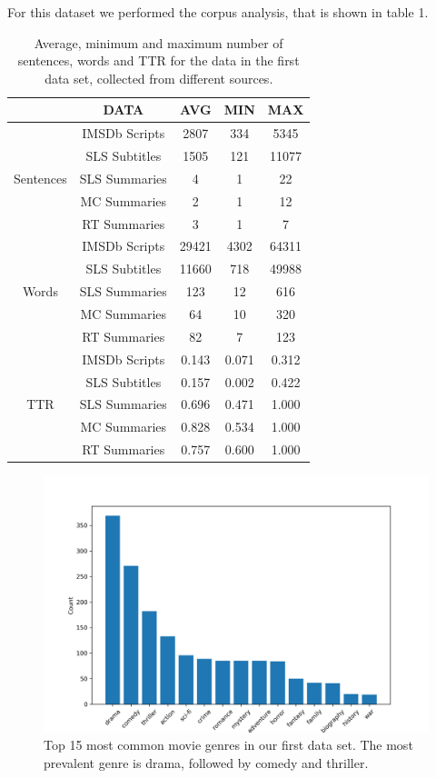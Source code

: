\documentclass[fleqn,moreauthors,10pt]{ds_report}
\begin{document}
For this dataset we performed the corpus analysis, that is shown in table 1. 

\begin{table}[h]
\caption{Average, minimum and maximum number of sentences, words and TTR for the data in the first data set, collected from different sources.}
\begin{center}
\begin{tabular}{c|c|ccc}
  & DATA & AVG & MIN &  MAX\\
 \hline
  & IMSDb Scripts &  2807&  334  & 5345\\ 
  & SLS Subtitles &  1505& 121 & 11077 \\
Sentences & SLS Summaries&  4 & 1 & 22 \\
& MC Summaries &  2 & 1 & 12\\
& RT Summaries &  3 & 1 & 7 \\
 \hline
  & IMSDb Scripts &  29421& 4302  & 64311\\ 
  & SLS Subtitles &  11660& 718 & 49988 \\
Words & SLS Summaries&  123 & 12 & 616 \\
& MC Summaries &  64 & 10 & 320\\
& RT Summaries &  82 & 7 & 123 \\
\hline
  & IMSDb Scripts &  0.143&  0.071  & 0.312\\ 
  & SLS Subtitles &  0.157& 0.002 & 0.422 \\
TTR & SLS Summaries&  0.696 & 0.471 & 1.000 \\
& MC Summaries &  0.828 & 0.534 & 1.000\\
& RT Summaries &  0.757 & 0.600 & 1.000 \\
\end{tabular}
\label{tab1}
\end{center}
\end{table}

\begin{figure}[h]
\begin{center}
\includegraphics[width=1.0\columnwidth]{movie_genres.png}
\end{center}
\caption{Top 15 most common movie genres in our first data set. The most prevalent genre is drama, followed by comedy and thriller.}
\label{fig1}
\end{figure}
\end{document}
